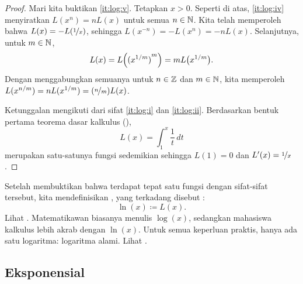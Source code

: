 \begin{proof}
Mari kita buktikan \ref{it:log:v}.
Tetapkan $x > 0$.
Seperti di atas, \ref{it:log:iv} menyiratkan
$L(x^n) = n L(x)$
untuk semua $n \in {\mathbb{N}}$.
Kita telah memperoleh bahwa
$L(x) = - L(\nicefrac{1}{x})$,
sehingga $L(x^{-n}) = - L(x^n) = -n L(x)$.  Selanjutnya, untuk $m \in {\mathbb{N}}$,
\begin{equation*}
L(x) = L\Bigl({(x^{1/m})}^m\Bigr) = m L\bigl(x^{1/m}\bigr) .
\end{equation*}
Dengan menggabungkan semuanya untuk $n \in {\mathbb{Z}}$ dan $m \in {\mathbb{N}}$, kita memperoleh
$L(x^{n/m}) = n L(x^{1/m}) = (\nicefrac{n}{m}) L(x)$.

Ketunggalan mengikuti dari sifat \ref{it:log:i} dan
\ref{it:log:ii}.  Berdasarkan bentuk pertama
teorema dasar kalkulus (),
\begin{equation*}
L(x) = \int_1^x \frac{1}{t}\,dt
\end{equation*}
merupakan satu-satunya fungsi sedemikian sehingga $L(1) = 0$ dan $L'(x) = \nicefrac{1}{x}$.
\end{proof}

Setelah membuktikan
bahwa terdapat tepat satu fungsi dengan sifat-sifat tersebut,
kita mendefinisikan \emph{}, yang terkadang disebut
\emph{}:
\begin{equation*}
\ln(x) \coloneqq L(x) .
\end{equation*}
Lihat .
Matematikawan biasanya menulis $\log(x)$, sedangkan mahasiswa kalkulus lebih akrab
dengan $\ln(x)$.  Untuk semua keperluan praktis, hanya ada satu logaritma:
logaritma alami.  Lihat .
\begin{myfigureht}
\caption{Grafik $\ln(x)$ bersama $\nicefrac{1}{x}$, yang menunjukkan nilai
$\ln(4)$.\label{fig:log}}
\end{myfigureht}

\subsection{Eksponensial}

